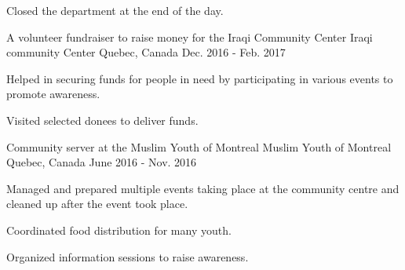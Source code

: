 \begin{cventries}
{\begin{cvitems}
        \item {Closed the department at the end of the day.}
      \end{cvitems}
    }
    \cventry
    {A volunteer fundraiser to raise money for the Iraqi Community Center}
    {Iraqi community Center}
    {Quebec, Canada}
    {Dec. 2016 - Feb. 2017}
    {
      \begin{cvitems}
        \item {Helped in securing funds for people in need by participating in various events to promote awareness.}
        \item {Visited selected donees to deliver funds.}
      \end{cvitems}
    }
    \cventry
    {Community server at the Muslim Youth of Montreal}
    {Muslim Youth of Montreal}
    {Quebec, Canada}
    {June 2016 - Nov. 2016}
    {
      \begin{cvitems}
        \item {Managed and prepared multiple events taking place at the community centre and cleaned up after the event took place.}
        \item {Coordinated food distribution for many youth.}
        \item {Organized information sessions to raise awareness.}
      \end{cvitems}
    }
    \end{cventries}
